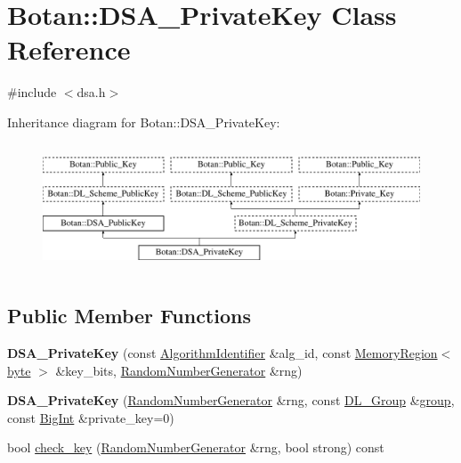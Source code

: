 \hypertarget{classBotan_1_1DSA__PrivateKey}{\section{Botan\-:\-:D\-S\-A\-\_\-\-Private\-Key Class Reference}
\label{classBotan_1_1DSA__PrivateKey}
}


{\ttfamily \#include $<$dsa.\-h$>$}

Inheritance diagram for Botan\-:\-:D\-S\-A\-\_\-\-Private\-Key\-:\begin{figure}[H]
\begin{center}
\leavevmode
\includegraphics[height=3.829060cm]{classBotan_1_1DSA__PrivateKey}
\end{center}
\end{figure}
\subsection*{Public Member Functions}
\begin{DoxyCompactItemize}
\item 
\hypertarget{classBotan_1_1DSA__PrivateKey_a218c38a9395101bc14e9b5eaf0eb7814}{{\bfseries D\-S\-A\-\_\-\-Private\-Key} (const \hyperlink{classBotan_1_1AlgorithmIdentifier}{Algorithm\-Identifier} \&alg\-\_\-id, const \hyperlink{classBotan_1_1MemoryRegion}{Memory\-Region}$<$ \hyperlink{namespaceBotan_a7d793989d801281df48c6b19616b8b84}{byte} $>$ \&key\-\_\-bits, \hyperlink{classBotan_1_1RandomNumberGenerator}{Random\-Number\-Generator} \&rng)}\label{classBotan_1_1DSA__PrivateKey_a218c38a9395101bc14e9b5eaf0eb7814}

\item 
\hypertarget{classBotan_1_1DSA__PrivateKey_ab7d18e9baac2e1b2fa186311b08973b3}{{\bfseries D\-S\-A\-\_\-\-Private\-Key} (\hyperlink{classBotan_1_1RandomNumberGenerator}{Random\-Number\-Generator} \&rng, const \hyperlink{classBotan_1_1DL__Group}{D\-L\-\_\-\-Group} \&\hyperlink{classBotan_1_1DL__Scheme__PublicKey_a99e61704126f6c0fcdf5475027a46500}{group}, const \hyperlink{classBotan_1_1BigInt}{Big\-Int} \&private\-\_\-key=0)}\label{classBotan_1_1DSA__PrivateKey_ab7d18e9baac2e1b2fa186311b08973b3}

\item 
bool \hyperlink{classBotan_1_1DSA__PrivateKey_a1baf041bbb069dbf75ff40b8ae660118}{check\-\_\-key} (\hyperlink{classBotan_1_1RandomNumberGenerator}{Random\-Number\-Generator} \&rng, bool strong) const 
\end{DoxyCompactItemize}
